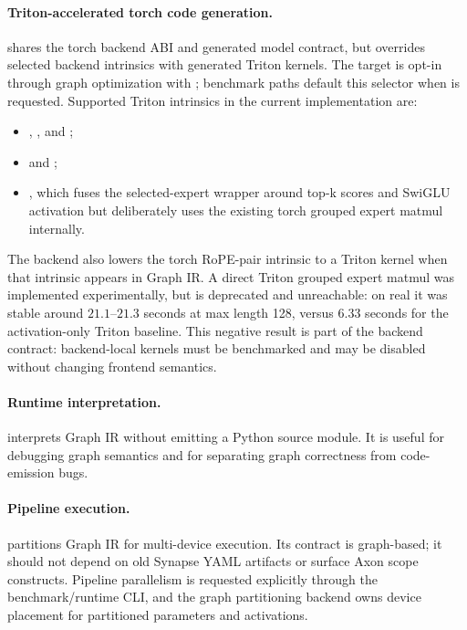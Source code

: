 \paragraph{Triton-accelerated torch code generation.}
 shares the torch backend ABI and generated model
contract, but overrides selected backend intrinsics with generated Triton
kernels.  The target is opt-in through graph optimization with
; benchmark paths default this
selector when  is requested.  Supported
Triton intrinsics in the current implementation are:
\begin{itemize}[leftmargin=*]
\item {},
      , and
      ;
\item {} and
      ;
\item {}, which fuses
      the selected-expert wrapper around top-k scores and SwiGLU activation but
      deliberately uses the existing torch grouped expert matmul internally.
\end{itemize}
The backend also lowers the torch RoPE-pair intrinsic to a Triton kernel when
that intrinsic appears in Graph IR.  A direct Triton grouped expert matmul was
implemented experimentally, but is deprecated and unreachable: on real
 it was stable around \(21.1\)--\(21.3\) seconds at
max length 128, versus \(6.33\) seconds for the activation-only Triton baseline.
This negative result is part of the backend contract: backend-local kernels
must be benchmarked and may be disabled without changing frontend semantics.

\paragraph{Runtime interpretation.}
 interprets Graph IR without emitting a Python source
module.  It is useful for debugging graph semantics and for separating graph
correctness from code-emission bugs.

\paragraph{Pipeline execution.}
 partitions Graph IR for multi-device execution.  Its
contract is graph-based; it should not depend on old Synapse YAML artifacts or
surface Axon scope constructs.  Pipeline parallelism is requested explicitly
through the benchmark/runtime CLI, and the graph partitioning backend owns
device placement for partitioned parameters and activations.

